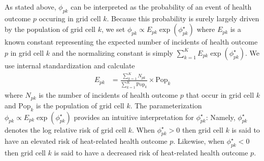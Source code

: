 \documentclass[final]{statsoc}
\begin{document}
As stated above, $\phi_{pk}$ can be interpreted as the probability of an event of health 
outcome $p$ occuring in grid cell $k$. Because this probability is surely largely driven 
by the population of grid cell $k$, we set $\phi_{pk} \propto E_{pk}\exp(\phi^\star_{pk})$ 
where $E_{pk}$ is a known constant representing the expected number of 
incidents of health outcome $p$ in grid cell $k$ and the normalizing constant is simply 
$\sum_{k=1}^K E_{pk}\exp(\phi_{pk}^\star)$. We use internal standardization
\citep[see][chapter 2]{Waller2004} and calculate
\begin{align}
E_{pk} &= \frac{\sum_{k=1}^K N_{pk}}{\sum_{k=1}^K \text{Pop}_k} \times \text{Pop}_k
\end{align} 
where $N_{pk}$ is the number of incidents of health outcome $p$ that occur in grid cell 
$k$ and $\text{Pop}_k$ is the population of grid cell $k$.  The parameterization 
$\phi_{pk} \propto E_{pk}\exp(\phi_{pk}^\star)$ provides an intuitive interpretation 
for $\phi_{pk}^\star$: Namely, $\phi_{pk}^\star$ denotes the log relative risk of 
grid cell $k$. When $\phi_{pk}^\star >0$ then grid cell $k$ is said to have an elevated 
risk of heat-related health outcome $p$. Likewise, when $\phi_{pk}^\star < 0$ then grid 
cell $k$ is said to have a decreased risk of heat-related health outcome $p$. 
\end{document}
